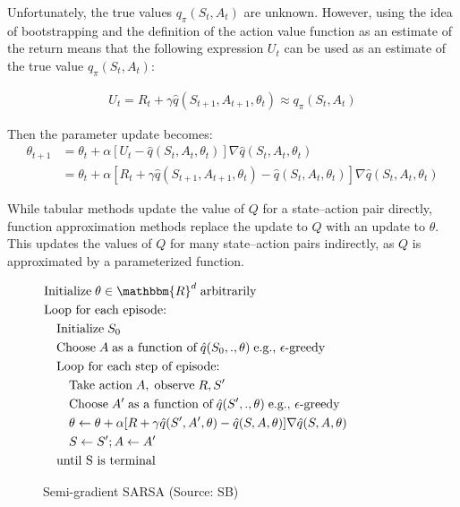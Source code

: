 Unfortunately, the true values $q_\pi(S_t, A_t)$ are unknown. However, using the idea of bootstrapping and the definition of the action value function as an estimate of the return means that the following expression $U_t$ can be used as an estimate of the true value $q_\pi(S_t, A_t)$: 

\begin{align*}
U_t = R_t + \gamma \hat{q}(S_{t+1}, A_{t+1}, \theta_t) \approx q_\pi(S_t, A_t)
\end{align*}

Then the parameter update becomes:
\begin{align}
\theta_{t+1} &= \theta_t + \alpha \left[ U_t - \hat{q}(S_t, A_t, \theta_t)\right] \nabla \hat{q}(S_t, A_t, \theta_t) \label{eq:dqnupdate} \\
 &= \theta_t + \alpha \left[ R_t + \gamma \hat{q}(S_{t+1}, A_{t+1}, \theta_t) - \hat{q}(S_t, A_t, \theta_t)\right] \nabla \hat{q}(S_t, A_t, \theta_t) \nonumber
\end{align}

\begin{tcolorbox}[colback=alert]
While tabular methods update the value of $Q$ for a state--action pair directly, function approximation methods replace the update to $Q$ with an update to $\theta$. This updates the values of $Q$ for many state--action pairs indirectly, as $Q$ is approximated by a parameterized function.
\end{tcolorbox}

\begin{figure}
\small
\begin{tcolorbox}[colback=code]
\vspace{-\baselineskip}
\begin{align*}
& \text{Initialize}\; \theta \in \mathbbm{R}^d \; \text{arbitrarily} \\
& \text{Loop for each episode:} \\
& \quad \text{Initialize}\; S_0 \\
& \quad \text{Choose}\; A \; \text{as a function of}\; \hat{q}(S_0, ., \theta) \; \text{e.g., $\epsilon$-greedy} \\ 
& \quad \text{Loop for each step of episode:} \\
& \quad \quad \text{Take action}\; A, \; \text{observe} \; R, S' \\
& \quad \quad \text{Choose}\; A' \; \text{as a function of}\; \hat{q}(S', ., \theta) \; \text{e.g., $\epsilon$-greedy} \\ 
& \quad \quad \theta \leftarrow \theta + \alpha [R + \gamma \hat{q}(S', A', \theta) - \hat{q}(S, A, \theta)] \nabla \hat{q}(S, A, \theta) \hspace{1in} \\
& \quad \quad S \leftarrow S'; A \leftarrow A'\\
& \quad \text{until S is terminal}
\end{align*}
\end{tcolorbox}
\caption[Semi-gradient SARSA]{Semi-gradient SARSA (Source: SB)}
\label{fig:gradientsarsa}
\end{figure}

